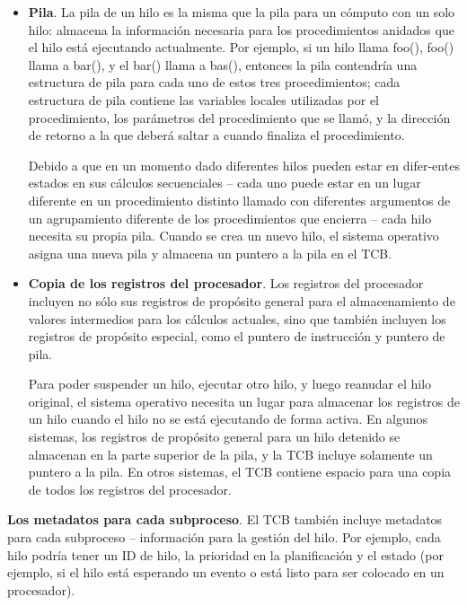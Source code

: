 \documentclass[10pt]{book}
\begin{document}
\begin{itemize}
\item \textbf{Pila}. La pila de un hilo es la misma que la pila para un cómputo con un solo hilo: almacena la información necesaria para los procedimientos anidados que el hilo está ejecutando actualmente. Por ejemplo, si un hilo llama {\mf foo()}, {\mf foo()} llama a {\mf bar()}, y el {\mf bar()} llama a {\mf bas()}, entonces la pila contendría una estructura de pila para cada uno de estos tres procedimientos; cada estructura de pila contiene las variables locales utilizadas por el procedimiento, los parámetros del procedimiento que se llamó, y la dirección de retorno a la que deberá saltar a cuando finaliza el procedimiento.

Debido a que en un momento dado diferentes hilos pueden estar en difer-entes estados en sus cálculos secuenciales -- cada uno puede estar en un lugar diferente en un procedimiento distinto llamado con diferentes argumentos de un agrupamiento diferente de los procedimientos que encierra -- cada hilo necesita su propia pila. Cuando se crea un nuevo hilo, el sistema operativo asigna una nueva pila y almacena un puntero a la pila en el TCB.

\item \textbf{Copia de los registros del procesador}. Los registros del procesador incluyen no sólo sus registros de propósito general para el almacenamiento de valores intermedios para los cálculos actuales, sino que también incluyen los registros de propósito especial, como el puntero de instrucción y puntero de pila.

Para poder suspender un hilo, ejecutar otro hilo, y luego reanudar el hilo original, el sistema operativo necesita un lugar para almacenar los registros de un hilo cuando el hilo no se está ejecutando de forma activa. En algunos sistemas, los registros de propósito general para un hilo detenido se almacenan en la parte superior de la pila, y la TCB incluye solamente un puntero a la pila. En otros sistemas, el TCB contiene espacio para una copia de todos los registros del procesador.
\end{itemize}

\textbf{Los metadatos para cada subproceso}. El TCB también incluye metadatos para cada subproceso -- información para la gestión del hilo. Por ejemplo, cada hilo podría tener un ID de hilo, la prioridad en la planificación y el estado (por ejemplo, si el hilo está esperando un evento o está listo para ser colocado en un procesador).
\end{document}

